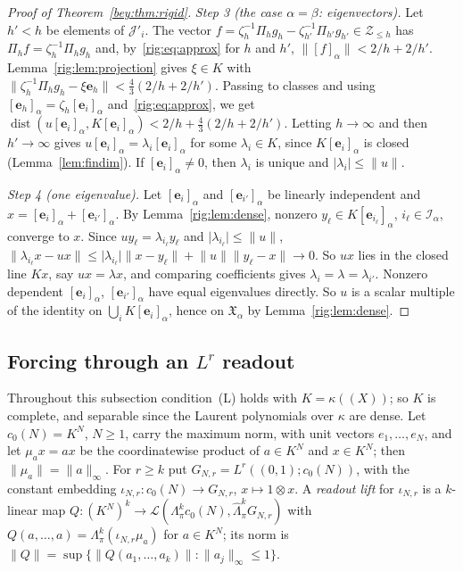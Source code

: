 \documentclass[11pt]{amsart}
\theoremstyle{definition}
\theoremstyle{remark}
\numberwithin{equation}{section}
\newcommand{\cL}{\mathcal L}
\newcommand{\abs}[1]{\lvert #1\rvert}
\newcommand{\norm}[1]{\lVert #1\rVert}
\theoremstyle{plain}
\theoremstyle{definition}
\theoremstyle{plain}
\newcommand{\fX}{\mathfrak X}
\begin{document}
\begin{proof}[Proof of Theorem~\textup{\ref{bey:thm:rigid}}]
\emph{Step 3 (the case $\alpha=\beta$: eigenvectors).} Let $h'<h$ be elements of $\mathcal J'_i$. The vector
$f=\zeta_h^{-1}\Pi_hg_h-\zeta_{h'}^{-1}\Pi_{h'}g_{h'}\in\mathcal Z_{\le h}$ has $\Pi_hf=\zeta_h^{-1}\Pi_hg_h$ and, by~\eqref{rig:eq:approx}
for $h$ and $h'$, $\norm{[f]_\alpha}<2/h+2/h'$. Lemma~\ref{rig:lem:projection} gives $\xi\in K$ with
$\norm{\zeta_h^{-1}\Pi_hg_h-\xi\mathbf e_h}<\frac43(2/h+2/h')$. Passing to classes and using
$[\mathbf e_h]_\alpha=\zeta_h[\mathbf e_i]_\alpha$ and~\eqref{rig:eq:approx}, we get
$\operatorname{dist}(u[\mathbf e_i]_\alpha,K[\mathbf e_i]_\alpha)<2/h+\frac43(2/h+2/h')$. Letting $h\to\infty$ and then
$h'\to\infty$ gives $u[\mathbf e_i]_\alpha=\lambda_i[\mathbf e_i]_\alpha$ for some $\lambda_i\in K$, since
$K[\mathbf e_i]_\alpha$ is closed (Lemma~\ref{lem:findim}). If $[\mathbf e_i]_\alpha\ne0$, then $\lambda_i$ is unique
and $\abs{\lambda_i}\le\norm u$.

\emph{Step 4 (one eigenvalue).} Let $[\mathbf e_i]_\alpha$ and $[\mathbf e_{i'}]_\alpha$ be linearly independent and
$x=[\mathbf e_i]_\alpha+[\mathbf e_{i'}]_\alpha$. By Lemma~\ref{rig:lem:dense}, nonzero
$y_\ell\in K[\mathbf e_{i_\ell}]_\alpha$, $i_\ell\in\mathcal I_\alpha$, converge to $x$. Since
$uy_\ell=\lambda_{i_\ell}y_\ell$ and $\abs{\lambda_{i_\ell}}\le\norm u$,
$\norm{\lambda_{i_\ell}x-ux}\le\abs{\lambda_{i_\ell}}\norm{x-y_\ell}+\norm u\norm{y_\ell-x}\to0$. So $ux$ lies in the
closed line $Kx$, say $ux=\lambda x$, and comparing coefficients gives $\lambda_i=\lambda=\lambda_{i'}$. Nonzero
dependent $[\mathbf e_i]_\alpha$, $[\mathbf e_{i'}]_\alpha$ have equal eigenvalues directly. So $u$ is a scalar
multiple of the identity on $\bigcup_iK[\mathbf e_i]_\alpha$, hence on $\fX_\alpha$ by Lemma~\ref{rig:lem:dense}.
\end{proof}

\subsection{Forcing through an \texorpdfstring{$L^r$}{L\textasciicircum r} readout}\label{rig:ssec:forcing}

Throughout this subsection condition~\textup{(L)} holds with $K=\kappa((X))$; so $K$ is complete, and separable since
the Laurent polynomials over $\kappa$ are dense. Let $c_0(N)=K^N$, $N\ge1$, carry the maximum norm, with unit vectors
$e_1,\dots,e_N$, and let $\mu_a x=ax$ be the coordinatewise product of $a\in K^N$ and $x\in K^N$; then
$\norm{\mu_a}=\norm a_\infty$. For $r\ge k$ put $G_{N,r}=L^r((0,1);c_0(N))$, with the constant embedding
$\iota_{N,r}\colon c_0(N)\to G_{N,r}$, $x\mapsto1\otimes x$. A \emph{readout lift} for $\iota_{N,r}$ is a $k$\nobreakdash-linear
map $Q\colon(K^N)^k\to\cL(\Lambda^k_\pi c_0(N),\widehat\Lambda^k_\pi G_{N,r})$ with
$Q(a,\dots,a)=\Lambda^k_\pi(\iota_{N,r}\mu_a)$ for $a\in K^N$; its norm is
$\norm Q=\sup\{\norm{Q(a_1,\dots,a_k)}:\norm{a_j}_\infty\le1\}$.
\end{document}
